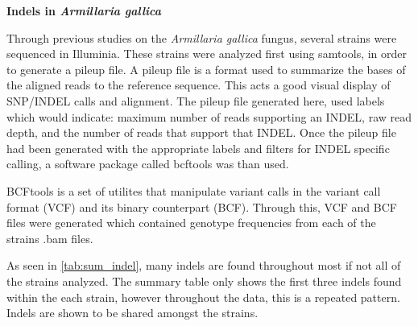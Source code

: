 \documentclass[../main.tex]{subfiles}
\begin{document}
\textbf{Indels in \textit{Armillaria gallica}}

Through previous studies on the \textit{Armillaria gallica} fungus, several strains were sequenced in Illuminia. These strains were analyzed first using samtools, in order to generate a pileup file. A pileup file is a format used to summarize the bases of the aligned reads to the reference sequence. This acts a good visual display of SNP/INDEL calls and alignment. The pileup file generated here, used labels which would indicate: maximum number of reads supporting an INDEL, raw read depth, and the number of reads that support that INDEL. Once the pileup file had been generated with the appropriate labels and filters for INDEL specific calling, a software package called bcftools was than used.  

BCFtools is a set of utilites that manipulate variant calls in the variant call format (VCF) and its binary counterpart (BCF). Through this, VCF and BCF files were generated which contained genotype frequencies from each of the strains .bam files. 

As seen in \ref{tab:sum_indel}, many indels are found throughout most if not all of the strains analyzed. The summary table only shows the first three indels found within the each strain, however throughout the data, this is a repeated pattern. Indels are shown to be shared amongst the strains. 
\end{document}
